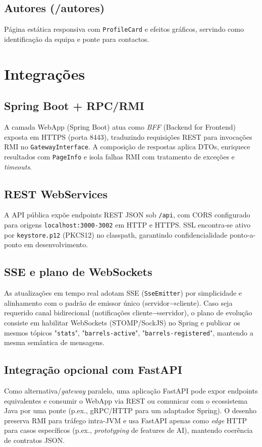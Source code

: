 \documentclass[12pt,a4paper]{article}
\begin{document}
\subsection{Autores (/autores)}
Página estática responsiva com \texttt{ProfileCard} e efeitos gráficos, servindo como identificação da equipa e ponte para contactos.

\newpage

\section{Integrações}

\subsection{Spring Boot + RPC/RMI}
A camada WebApp (Spring Boot) atua como \textit{BFF} (Backend for Frontend) exposta em HTTPS (porta 8443), traduzindo requisições REST para invocações RMI no \texttt{GatewayInterface}. A composição de respostas aplica DTOs, enriquece resultados com \texttt{PageInfo} e isola falhas RMI com tratamento de exceções e \textit{timeouts}.

\subsection{REST WebServices}
A API pública expõe endpoints REST JSON sob \texttt{/api}, com CORS configurado para origens \texttt{localhost:3000-3002} em HTTP e HTTPS. SSL encontra-se ativo por \texttt{keystore.p12} (PKCS12) no classpath, garantindo confidencialidade ponto-a-ponto em desenvolvimento.

\subsection{SSE e plano de WebSockets}
As atualizações em tempo real adotam SSE (\texttt{SseEmitter}) por simplicidade e alinhamento com o padrão de emissor único (servidor→cliente). Caso seja requerido canal bidirecional (notificações cliente→servidor), o plano de evolução consiste em habilitar WebSockets (STOMP/SockJS) no Spring e publicar os mesmos tópicos "\texttt{stats}", "\texttt{barrels-active}", "\texttt{barrels-registered}", mantendo a mesma semântica de mensagens.

\subsection{Integração opcional com FastAPI}
Como alternativa/\textit{gateway} paralelo, uma aplicação FastAPI pode expor endpoints equivalentes e consumir o WebApp via REST ou comunicar com o ecossistema Java por uma ponte (p.ex., gRPC/HTTP para um adaptador Spring). O desenho preserva RMI para tráfego intra-JVM e usa FastAPI apenas como \textit{edge} HTTP para casos específicos (p.ex., \textit{prototyping} de features de AI), mantendo coerência de contratos JSON.
\end{document}
